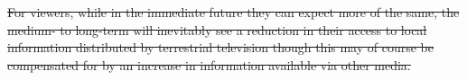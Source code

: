 \documentclass[11pt, oneside, a4paper, headsepline]{scrartcl}
\begin{document}


\st{For viewers, while in the immediate future they can expect more of the same, the medium- to long-term will inevitably see a reduction in their access to local information distributed by terrestrial television though this may of course be compensated for by an increase in information available via other media. 
}



\pagebreak

\printbibliography
\end{document}
